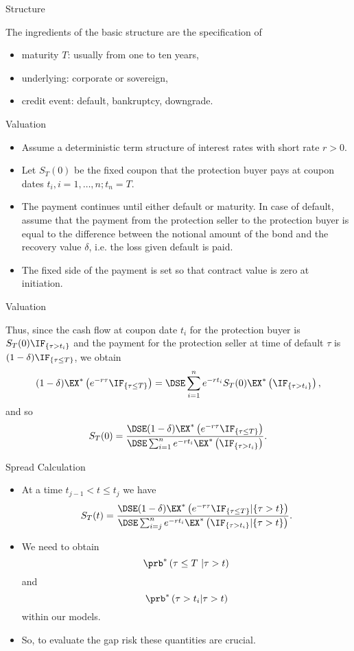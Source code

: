 {Structure}

The ingredients of the basic structure are the specification of
\begin{itemize}
\item<1-> maturity $T$: usually from one to ten years,
\item<2->
underlying: corporate or sovereign, \item<3-> credit event:
default, bankruptcy, downgrade.
\end{itemize}

{Valuation}

\begin{itemize}
\item<1-> Assume a deterministic term structure of interest rates with short rate $r>0$.
\item<2->Let $S_T(0)$ be the fixed coupon that the protection buyer pays at coupon dates
$t_i, i=1,\ldots, n; t_n=T$.
\item<3->The
payment continues until either default or maturity. In case of
default, assume that the payment from the protection seller to the
protection buyer is equal to the difference between the notional
amount of the bond and the recovery value $\delta$, i.e. the loss given default is paid.
\item<4->The fixed side
of the payment is set so that contract value is zero at
initiation.
\end{itemize}

{Valuation}

Thus, since the cash flow at coupon date $t_i$ for the protection
buyer is $S_T(0)\IF_{\{\tau>t_i\}}$ and the payment for the protection
seller at time of default $\tau$ is $(1-\delta)\IF_{\{\tau\leq
T\}}$, we obtain
$$
(1-\delta)\EX^*\left(e^{-r\tau}\IF_{\{\tau\leq
T\}}\right) = \DSE\sum_{i=1}^n e^{-rt_i} S_T(0)\EX^*\left(\IF_{\{\tau
>t_i\}}\right),
$$
and so
$$
S_T(0)=\frac{\DSE (1-\delta)\EX^*\left(e^{-r\tau}\IF_{\{\tau\leq
T\}}\right)} {\DSE\sum_{i=1}^n e^{-rt_i} \EX^*\left(\IF_{\{\tau
>t_i\}}\right)}.
$$

{Spread Calculation}

\begin{itemize}
\item<1-> At a time $t_{j-1} < t \leq t_j$ we have
$$
S_T(t)=\frac{\DSE (1-\delta)\EX^*\left(e^{-r\tau}\IF_{\{\tau\leq
T\} }  | \{\tau >t\}\right)} {\DSE\sum_{i=j}^n e^{-rt_i} \EX^*\left(\IF_{\{\tau
>t_i\}}| \{\tau >t\}\right)}.
$$

\item<1-> We need to obtain
$$\prb^*\left(\tau\leq T\ | \tau >t \right)$$ and
$$\prb^*\left(\tau >t_i | \tau >t\right)$$ within our models.
\item<2-> So, to evaluate the gap risk these quantities are crucial.  \end{itemize}

